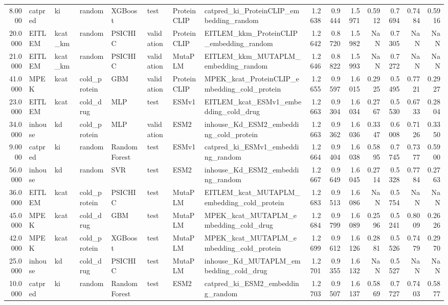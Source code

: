 \begin{tabular}{rlllllllrrrrrrr}
8.0000 & catpred & ki & random & XGBoost & test & ProteinCLIP & catpred_ki_ProteinCLIP_embedding_random & 1.2638 & 0.9444 & 1.5971 & 0.5912 & 0.7694 & 0.7484 & 0.5916 \\
20.0000 & EITLEM & kcat_km & random & PSICHIC & validation & ProteinCLIP & EITLEM_kkm_ProteinCLIP_embedding_random & 1.2642 & 0.8720 & 1.5982 & NaN & 0.7305 & NaN & NaN \\
21.0000 & EITLEM & kcat_km & random & PSICHIC & validation & MutaPLM & EITLEM_kkm_MUTAPLM_embedding_random & 1.2646 & 0.8822 & 1.5993 & NaN & 0.7272 & NaN & NaN \\
41.0000 & MPEK & kcat & cold_protein & GBM & validation & ProteinCLIP & MPEK_kcat_ProteinCLIP_embedding_cold_protein & 1.2655 & 0.9597 & 1.6015 & 0.2925 & 0.5495 & 0.7721 & 0.2927 \\
23.0000 & EITLEM & kcat & cold_drug & MLP & test & ESMv1 & EITLEM_kcat_ESMv1_embedding_cold_drug & 1.2663 & 0.9304 & 1.6034 & 0.2767 & 0.5530 & 0.6733 & 0.2804 \\
34.0000 & inhouse & kd & cold_protein & MLP & validation & ESM2 & inhouse_Kd_ESM2_embedding_cold_protein & 1.2663 & 0.9362 & 1.6036 & 0.3347 & 0.6008 & 0.7126 & 0.3350 \\
9.0000 & catpred & ki & random & Random Forest & test & ESMv1 & catpred_ki_ESMv1_embedding_random & 1.2664 & 0.9404 & 1.6038 & 0.5895 & 0.7745 & 0.7377 & 0.5900 \\
56.0000 & inhouse & kd & random & SVR & test & ESM2 & inhouse_Kd_ESM2_embedding_random & 1.2667 & 0.9649 & 1.6045 & 0.2714 & 0.5328 & 0.7784 & 0.2763 \\
36.0000 & EITLEM & kcat & cold_protein & PSICHIC & test & MutaPLM & EITLEM_kcat_MUTAPLM_embedding_cold_protein & 1.2683 & 0.9513 & 1.6086 & NaN & 0.5754 & NaN & NaN \\
45.0000 & MPEK & kcat & cold_drug & GBM & test & MutaPLM & MPEK_kcat_MUTAPLM_embedding_cold_drug & 1.2684 & 0.9799 & 1.6089 & 0.2596 & 0.5241 & 0.8009 & 0.2626 \\
42.0000 & MPEK & kcat & cold_protein & XGBoost & test & MutaPLM & MPEK_kcat_MUTAPLM_embedding_cold_protein & 1.2699 & 0.9612 & 1.6126 & 0.2881 & 0.5526 & 0.7479 & 0.2970 \\
25.0000 & inhouse & kd & cold_drug & PSICHIC & test & MutaPLM & inhouse_Kd_MUTAPLM_embedding_cold_drug & 1.2701 & 0.9355 & 1.6132 & NaN & 0.5527 & NaN & NaN \\
10.0000 & catpred & ki & random & Random Forest & test & ESM2 & catpred_ki_ESM2_embedding_random & 1.2703 & 0.9507 & 1.6137 & 0.5869 & 0.7727 & 0.7403 & 0.5877 \\

\end{tabular}
